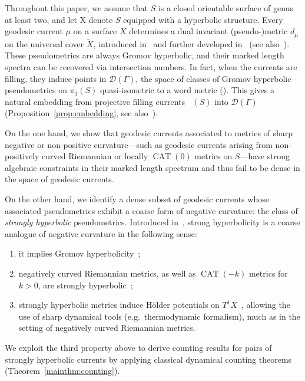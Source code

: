 \documentclass[12pt]{amsart}
\numberwithin{equation}{section}
\numberwithin{figure}{section}
\theoremstyle{definition}
\theoremstyle{plain}
\DeclareMathOperator{\CAT}{CAT}
\DeclareMathOperator{\PCf}{\mathbb{P}\mathcal{C}_{\mbox{f}}}
\begin{document}
Throughout this paper, we assume that $S$ is a closed orientable surface of genus at least two, and let X denote $S$ equipped with a hyperbolic structure. Every geodesic current $\mu$ on a surface $X$ determines a dual invariant (pseudo-)metric $d_\mu$ on the universal cover $\widetilde{X}$, introduced in~\cite{BIPP21:Currents} and further developed in~\cite{DRMG23:Duals} (see also~\cite{COR22:Manhattan}). These pseudometrics are always Gromov hyperbolic, and their marked length spectra can be recovered via intersection numbers. In fact, when the currents are filling, they induce points in $\mathcal{D}(\Gamma)$, the space of classes of Gromov hyperbolic pseudometrics on $\pi_1(S)$ quasi-isometric to a word metric (\cite{Fur02:Coarse,OR22:SpaceMetric,DRMG23:Duals,CT25:Manhattan,CMGR26:GreenMetrics}). This gives a natural embedding from projective filling currents $\PCf(S)$ into $\mathcal{D}(\Gamma)$ (Proposition~\ref{prop:embedding}, see also~\cite[Proposition~6.12]{COR22:Manhattan}).

On the one hand, we show that geodesic currents associated to metrics of sharp negative or non-positive curvature---such as geodesic currents arising from non-positively curved Riemannian or locally $\CAT(0)$ metrics on $S$---have strong algebraic constraints in their marked length spectrum and thus fail to be dense in the space of geodesic currents.

On the other hand, we identify a dense subset of geodesic currents whose associated pseudometrics exhibit a coarse form of negative curvature: the class of \emph{strongly hyperbolic} pseudometrics. Introduced in~\cite{NicaSpakula2016}, strong hyperbolicity is a coarse analogue of negative curvature in the following sense:
\begin{enumerate}
\item it implies Gromov hyperbolicity~\cite[Theorem~4.2]{NicaSpakula2016};
\item negatively curved Riemannian metrics, as well as $\CAT(-k)$ metrics for $k>0$, are strongly hyperbolic~\cite[Theorem~5.1]{NicaSpakula2016};
\item strongly hyperbolic metrics induce H\"older potentials on $T^1X$~\cite[Example~4.12]{CMGR26:GreenMetrics}, allowing the use of sharp dynamical tools (e.g.\ thermodynamic formalism), much as in the setting of negatively curved Riemannian metrics.
\end{enumerate}

We exploit the third property above to derive counting results for pairs of strongly hyperbolic currents by applying classical dynamical counting theorems (Theorem~\ref{mainthm:counting}).
\end{document}

